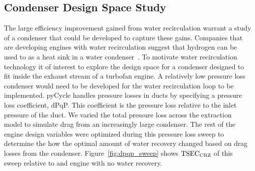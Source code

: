 \documentclass[conf]{new-aiaa}
\begin{document}
\subsection{Condenser Design Space Study}
\label{sub:dpqp_sweep}
The large efficiency improvement gained from water recirculation warrant a study of a condenser that could be developed to capture these gains.
Companies that are developing engines with water recirculation suggest that hydrogen can be used to as a heat sink in a water condenser~\cite{arpa-e_2021}.
To motivate water recirculation technology it of interest to explore the design space for a condenser designed to fit inside the exhaust stream of a turbofan engine.
A relatively low pressure loss condenser would need to be developed for the water recirculation loop to be implemented.
pyCycle handles pressure losses in ducts by specifying a pressure loss coefficient, dPqP.
This coefficient is the pressure loss relative to the inlet pressure of the duct.
We varied the total pressure loss across the extraction model to simulate drag from an increasingly large condenser.
The rest of the engine design variables were optimized during this pressure loss sweep to determine the how the optimal amount of water recovery changed based on drag losses from the condenser.
Figure~\ref{fig:dpqp_sweep} shows $\rm{TSEC}_{\rm{CRZ}}$ of this sweep relative to and engine with no water recovery.
\end{document}
